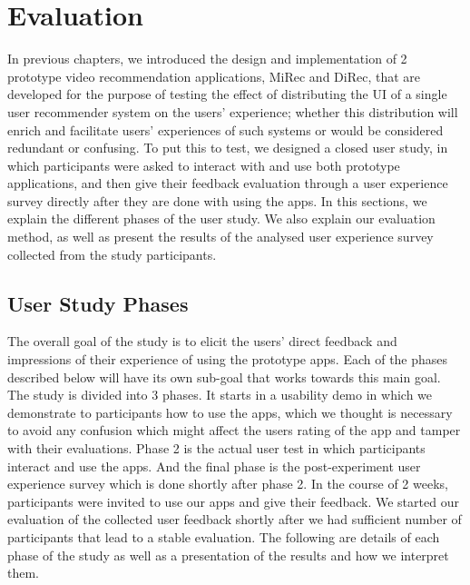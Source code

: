 \chapter{Evaluation}\label{chapter:eval}
In previous chapters, we introduced the design and implementation of 2 prototype
video recommendation applications, MiRec and DiRec, that are developed for the
purpose of testing the effect of distributing the UI of a single user recommender system on the users'
experience; whether this distribution will enrich and facilitate users'
experiences of such systems or would be considered redundant or confusing. To
put this to test, we designed a closed user study, in which participants were
asked to interact with and use both prototype applications, and then give their
feedback evaluation through a user experience survey directly after they are done with
using the apps. In this sections, we explain the different phases of the user
study. We also explain our evaluation method, as well as present the results of
the analysed user experience survey collected from the study participants.

\section{User Study Phases}
The overall goal of the study is to elicit the users’ direct
feedback and impressions of their experience of using the prototype apps.
Each of the phases described below will have its own sub-goal that works
towards this main goal. The study is divided into 3 phases. It starts in a
usability demo in which we demonstrate to participants how to use the apps,
which we thought is necessary to avoid any confusion which might affect the
users rating of the app and tamper with their evaluations. Phase 2 is the actual
user test in which participants interact and use the apps. And the final phase
is the post-experiment user experience survey which is done shortly after phase
2. In the course of 2 weeks, participants were invited to use our apps and give
their feedback. We started our evaluation of the collected user feedback shortly
after we had sufficient number of participants that lead to a stable evaluation.
The following are details of each phase of the study as well as a presentation
of the results and how we interpret them.

